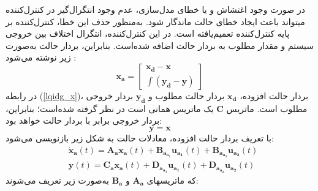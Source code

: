 در صورت وجود اغتشاش و یا خطای مدل‌سازی، عدم وجود انتگرال‌گیر در کنترل‌کننده
 میتواند باعث ایجاد خطای حالت ماندگار شود. به‌منظور حذف این خطا، کنترل‌کننده
 بر پایه کنترل‌کننده
 تعمیم‌یافته است. در این کنترل‌کننده، انتگرال اختلاف بین خروجی سیستم و مقدار مطلوب به بردار حالت اضافه شده‌است. بنابراین، بردار حالت به‌صورت زیر نوشته می‌شود
 \cite{reza_pordal}:
 \begin{equation}\label{lqidg_x}
 	\boldsymbol{x_a} = \begin{bmatrix}
 		\boldsymbol{x_d} - \boldsymbol{x}\\
 		\displaystyle \int (\boldsymbol{y_d} - \boldsymbol{y})
 	\end{bmatrix}
 \end{equation}
در رابطه
(\ref{lqidg_x})،
بردار حالت افزوده،
$	\boldsymbol{x_d}$
بردار حالت مطلوب و
$	\boldsymbol{y_d}$
  بردار خروجی مطلوب است. ماتریس
  $	\boldsymbol{C}$
 یک ماتریس همانی است در نظر گرفته شده‌است؛ بنابراین، بردار خروجی برابر با بردار حالت خواهد
بود:
\begin{equation}
	\boldsymbol{y} = \boldsymbol{x}
\end{equation}
با تعریف بردار حالت افزوده، معادلات حالت به شكل زیر بازنویسی می‌شود:
 \begin{equation}\label{systemlqidg}
	\begin{split}
		&\boldsymbol{\dot x_a}(t) = \boldsymbol{A_ax_a}(t) + \boldsymbol{B_{a_{a_1}}u_{a_1}}(t) + \boldsymbol{B_{a_{a_2}}u_{a_2}}(t)%
		\\
		&\boldsymbol{y}(t) = \boldsymbol{C_ax_a}(t) + \boldsymbol{D_{a_{a_1}}u_{a_1}}(t) + \boldsymbol{D_{a_{a_2}}u_{a_2}}(t)
	\end{split}
\end{equation}
که ماتریسهای $\boldsymbol{A_a}$ و $\boldsymbol{B_a}$ به‌صورت زیر تعریف می‌شوند:


